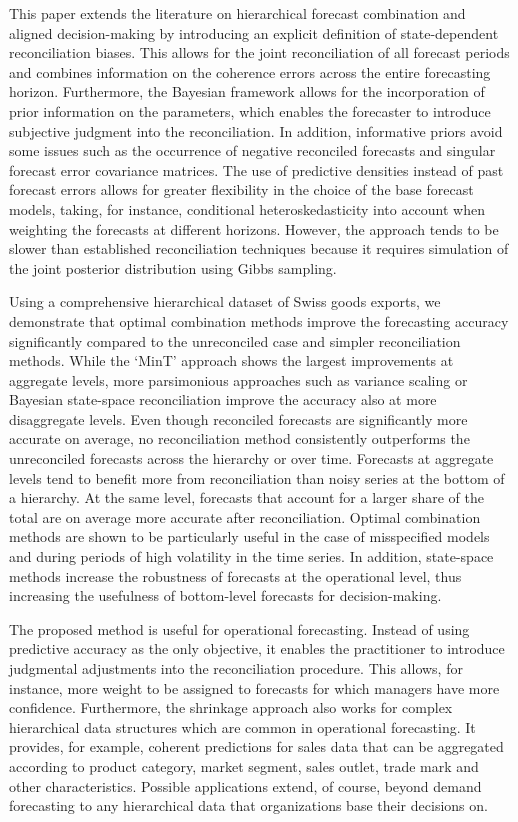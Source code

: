 \documentclass[a4paper,fleqn,11pt]{article}
\begin{document}
This paper extends the literature on hierarchical forecast combination and aligned decision-making by introducing an explicit definition of state-dependent reconciliation biases. This allows for the joint reconciliation of all forecast periods and combines information on the coherence errors across the entire forecasting horizon. Furthermore, the Bayesian framework allows for the incorporation of prior information on the parameters, which enables the forecaster to introduce subjective judgment into the reconciliation. In addition, informative priors avoid some issues such as the occurrence of negative reconciled forecasts and singular forecast error covariance matrices. The use of predictive densities instead of past forecast errors allows for greater flexibility in the choice of the base forecast models, taking, for instance, conditional heteroskedasticity into account when weighting the forecasts at different horizons. However, the approach tends to be slower than established reconciliation techniques because it requires simulation of the joint posterior distribution using Gibbs sampling.

Using a comprehensive hierarchical dataset of Swiss goods exports, we demonstrate that optimal combination methods improve the forecasting accuracy significantly compared to the unreconciled case and simpler reconciliation methods. While the `MinT' approach shows the largest improvements at aggregate levels, more parsimonious approaches such as variance scaling or Bayesian state-space reconciliation improve the accuracy also at more disaggregate levels. Even though reconciled forecasts are significantly more accurate on average, no reconciliation method consistently outperforms the unreconciled forecasts across the hierarchy or over time. Forecasts at aggregate levels tend to benefit more from reconciliation than noisy series at the bottom of a hierarchy. At the same level, forecasts that account for a larger share of the total are on average more accurate after reconciliation. Optimal combination methods are shown to be particularly useful in the case of misspecified models and during periods of high volatility in the time series. In addition, state-space methods increase the robustness of forecasts at the operational level, thus increasing the usefulness of bottom-level forecasts for decision-making.

The proposed method is useful for operational forecasting. Instead of using predictive accuracy as the only objective, it enables the practitioner to introduce judgmental adjustments into the reconciliation procedure. This allows, for instance, more weight to be assigned to forecasts for which managers have more confidence. Furthermore, the shrinkage approach also works for complex hierarchical data structures which are common in operational forecasting. It provides, for example, coherent predictions for sales data that can be aggregated according to product category, market segment, sales outlet, trade mark and other characteristics. Possible applications extend, of course, beyond demand forecasting to any hierarchical data that organizations base their decisions on. 





\end{document}
